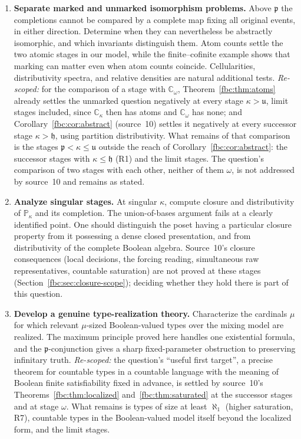 \documentclass[11pt,letterpaper]{article}
\theoremstyle{definition}
\theoremstyle{remark}
\newcommand{\om}{\omega}
\newcommand{\C}{\mathbb C}
\newcommand{\PP}{\mathbb P}
\newcommand{\cp}{\mathfrak p}
\newcommand{\cu}{\mathfrak u}
\newcommand{\ch}{\mathfrak h}
\begin{document}
\begin{enumerate}[label=\textbf{Q\arabic*.},leftmargin=3em]
\item \textbf{Separate marked and unmarked isomorphism problems.}
Above $\cp$ the completions cannot be compared by a complete map
fixing all original events, in either direction. Determine when they can
nevertheless be abstractly isomorphic, and which invariants distinguish
them. Atom counts settle the two atomic stages in our model, while the
finite--cofinite example shows that marking can matter even when
atom counts coincide. Cellularities, distributivity spectra, and
relative densities are natural additional tests.
\emph{Re-scoped:} for the comparison of a stage with $\C_\om$,
Theorem~\ref{fbc:thm:atoms} already settles the unmarked question
negatively at every stage $\kappa>\cu$, limit stages included, since
$\C_\kappa$ then has atoms and $\C_\om$ has none; and
Corollary~\ref{fbc:cor:abstract} (source~10) settles it negatively at
every successor stage $\kappa>\ch$, using partition distributivity. What
remains of that comparison is the stages $\cp<\kappa\leq\cu$ outside the
reach of Corollary~\ref{fbc:cor:abstract}: the successor stages with
$\kappa\leq\ch$ (R1) and the limit stages. The question's comparison of two
stages with each other, neither of them $\om$, is not addressed by
source~10 and remains as stated.

\item \textbf{Analyze singular stages.}
At singular $\kappa$, compute closure and distributivity of
$\PP_\kappa$ and its completion. The union-of-bases argument
fails at a clearly identified point. One should distinguish the
poset having a particular closure property from it possessing a
dense closed presentation, and from distributivity of the complete
Boolean algebra. Source~10's closure consequences (local decisions,
the forcing reading, simultaneous raw representatives, countable
saturation) are not proved at these stages
(Section~\ref{fbc:sec:closure-scope}); deciding whether they hold there
is part of this question.

\item \textbf{Develop a genuine type-realization theory.}
Characterize the cardinals $\mu$ for which relevant $\mu$-sized
Boolean-valued types over the mixing model are realized. The maximum
principle proved here handles one existential formula, and the
$\cp$-conjunction gives a sharp fixed-parameter obstruction to
preserving infinitary truth.
\emph{Re-scoped:} the question's ``useful first target'', a precise
theorem for countable types in a countable language with the meaning of
Boolean finite satisfiability fixed in advance, is settled by source~10's
Theorems~\ref{fbc:thm:localized} and~\ref{fbc:thm:saturated} at the
successor stages and at stage $\om$. What remains is types of size at
least $\aleph_1$ (higher saturation, R7), countable types in the
Boolean-valued model itself beyond the localized form, and the limit
stages.


\end{enumerate}
\end{document}
